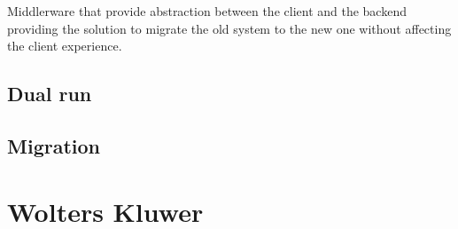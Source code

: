 Middlerware that provide abstraction between the client and the backend providing
the solution to migrate the old system to the new one without affecting the client experience.

\subsection{Dual run}




\subsection{Migration}

\section{Wolters Kluwer}











